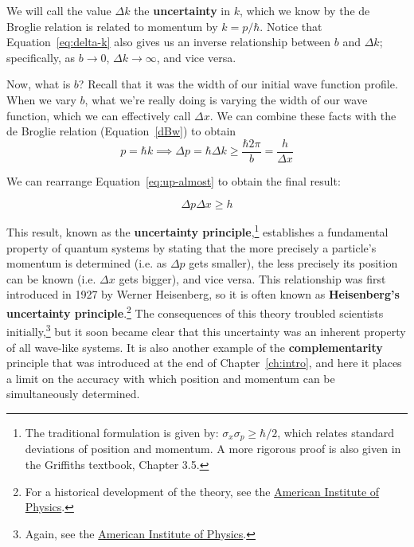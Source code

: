 We will call the value $\Delta k$ the \textbf{uncertainty} in $k$, which we know by the de Broglie relation is related to momentum by $k=p/\hbar$. Notice that Equation~\ref{eq:delta-k} also gives us an inverse relationship between $b$ and $\Delta k$; specifically, as $b \rightarrow 0$, $\Delta k \rightarrow \infty$, and vice versa. \par 

Now, what is $b$? Recall that it was the width of our initial wave function profile. When we vary $b$, what we're really doing is varying the width of our wave function, which we can effectively call $\Delta x$. We can combine these facts with the de Broglie relation (Equation~\ref{dBw}) to obtain
\begin{equation}
	p = \hbar k \implies \Delta p = \hbar \Delta k \ge  \frac{\hbar 2\pi}{b} = \frac{h}{\Delta x} \label{eq:up-almost}
\end{equation}

We can rearrange Equation~\ref{eq:up-almost} to obtain the final result:
\begin{tcolorbox}[title = Uncertainty principle] \vspace{-2ex}
	\begin{equation}
		\Delta p \Delta x \ge h \label{eq:up}
	\end{equation}
\end{tcolorbox}

This result, known as the \textbf{uncertainty principle},\footnote{The traditional formulation is given by: $\sigma_x\sigma_p \ge \hbar/2$, which relates standard deviations of position and momentum. A more rigorous proof is also given in the Griffiths textbook, Chapter 3.5.} establishes a fundamental property of quantum systems by stating that the more precisely a particle's momentum is determined (i.e. as $\Delta p$ gets smaller), the less precisely its position can be known (i.e. $\Delta x$ gets bigger), and vice versa. This relationship was first introduced in 1927 by Werner Heisenberg, so it is often known as \textbf{Heisenberg's uncertainty principle}.\footnote{For a historical development of the theory, see the \href{http://history.aip.org/exhibits/heisenberg/p08.htm}{American Institute of Physics}.} The consequences of this theory troubled scientists initially,\footnote{Again, see the \href{http://history.aip.org/exhibits/heisenberg/p08c.htm}{American Institute of Physics}.} but it soon became clear that this uncertainty was an inherent property of all wave-like systems. It is also another example of the \textbf{complementarity} principle that was introduced at the end of Chapter~\ref{ch:intro}, and here it places a limit on the accuracy with which position and momentum can be simultaneously determined.

